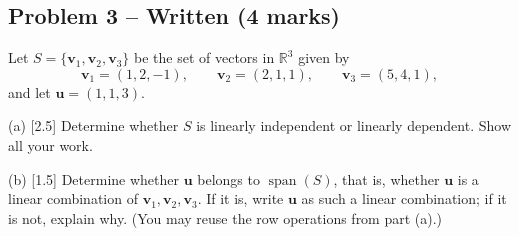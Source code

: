 \documentclass[11pt,a4paper]{article}
\begin{document}
\subsection*{Problem 3 -- Written (4 marks)}
Let $S=\{\mathbf{v}_1,\mathbf{v}_2,\mathbf{v}_3\}$ be the set of vectors in $\mathbb{R}^3$ given by\[\mathbf{v}_1=(1,2,-1),\qquad \mathbf{v}_2=(2,1,1),\qquad \mathbf{v}_3=(5,4,1),\]and let $\mathbf{u}=(1,1,3)$.\par (a) [2.5] Determine whether $S$ is linearly independent or linearly dependent. Show all your work.\par (b) [1.5] Determine whether $\mathbf{u}$ belongs to $\operatorname{span}(S)$, that is, whether $\mathbf{u}$ is a linear combination of $\mathbf{v}_1,\mathbf{v}_2,\mathbf{v}_3$. If it is, write $\mathbf{u}$ as such a linear combination; if it is not, explain why. (You may reuse the row operations from part (a).)\par
\end{document}
